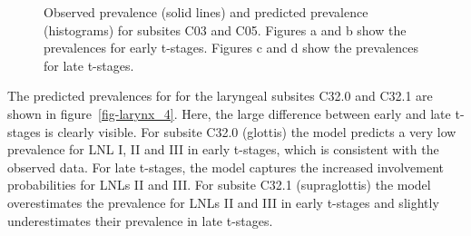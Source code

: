 \documentclass[
  sn-mathphys-num,
]{sn-jnl}
\begin{document}
\begin{figure}
\begin{minipage}{\linewidth}
{}

\subcaption{\label{fig-oral_cavity_C03_late}}

\end{minipage}%
\newline
\begin{minipage}{\linewidth}


\subcaption{\label{fig-oral_cavity_C05_late}}

\end{minipage}%

\caption{\label{fig-oral_cavity_4}Observed prevalence (solid lines) and
predicted prevalence (histograms) for subsites C03 and C05. Figures a
and b show the prevalences for early t-stages. Figures c and d show the
prevalences for late t-stages.}

\end{figure}%

The predicted prevalences for for the laryngeal subsites C32.0 and C32.1
are shown in figure~\ref{fig-larynx_4}. Here, the large difference
between early and late t-stages is clearly visible. For subsite C32.0
(glottis) the model predicts a very low prevalence for LNL I, II and III
in early t-stages, which is consistent with the observed data. For late
t-stages, the model captures the increased involvement probabilities for
LNLs II and III. For subsite C32.1 (supraglottis) the model
overestimates the prevalence for LNLs II and III in early t-stages and
slightly underestimates their prevalence in late t-stages.
\end{document}
